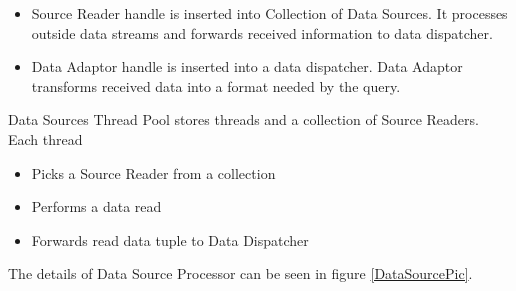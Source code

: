 \documentclass[14pt]{article}
\begin{document}
\begin{itemize}
\item Source Reader handle is inserted into Collection of Data Sources. It processes outside data streams and forwards received information to data dispatcher.
\item Data Adaptor handle is inserted into a data dispatcher. Data Adaptor transforms received data into a format needed by the query.
\end{itemize} 

Data Sources Thread Pool stores threads and a collection of Source Readers. Each thread 

\begin{itemize}
	\item Picks a Source Reader from a collection
	\item Performs a data read 
	\item Forwards read data tuple to Data Dispatcher
\end{itemize}

\noindent The details of Data Source Processor can be seen in figure \ref{DataSourcePic}.


\end{document}

